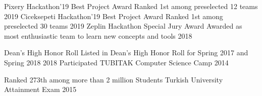

\cvsubsection{ }
\vspace{-3.2mm}
\begin{cvhonors}
  \cvhonor
    {Pixery Hackathon'19 Best Project Award} %
    {Ranked 1st among preselected 12 teams} %
    {} %
    {2019} %
  \cvhonor
    {Ciceksepeti Hackathon'19 Best Project Award} %
    {Ranked 1st among preselected 30 teams} %
    {} %
    {2019} %
  \cvhonor
    {Zeplin Hackathon Special Jury Award} %
    {Awarded as most enthusiastic team to learn new concepts and tools} %
    {} %
    {2018} %


  \cvhonor
    {Dean’s High Honor Roll } %
    {Listed in Dean's High Honor Roll for Spring 2017 and Spring 2018} %
    {} %
    {2018} %
  \cvhonor
    {Participated} %
    {TUBITAK Computer Science Camp} %
    {} %
    {2014} %

  \cvhonor
    {Ranked 273th among more than 2 million Students} %
    {Turkish University Attainment Exam} %
    {} %
    {2015} %
\begin{comment}
  \cvhonor
    {Ranked 1th among more than 1 million Students} %
    {Turkish High School Attainment Exam} %
    {} %
    {2011} %



  \cvhonor
    {Ranked in top 50} %
    {TUBITAK National Middle School Mathematic Olympiads} %
    {} %
    {2014} %


  \cvhonor
    {Vehbi Koc Scholar} %
    {Awarded for SPA over 3.50 /4.00 in Fall 2016, Spring 2017 and Fall 2017} %
    {} %
    {2017} %
\end{comment}
\end{cvhonors}



